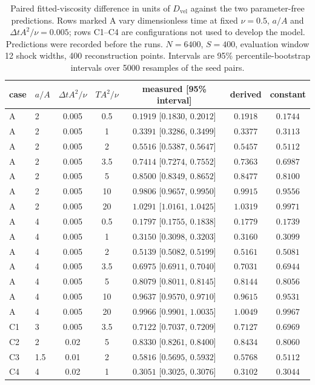 \begin{table}[!htbp]
\centering\small
\caption{Paired fitted-viscosity difference in units of $D_{\mathrm{vel}}$ against the two parameter-free predictions. Rows marked A vary dimensionless time at fixed $\nu=0.5$, $a/A$ and $\Delta t A^2/\nu=0.005$; rows C1--C4 are configurations not used to develop the model. Predictions were recorded before the runs. $N=6400$, $S=400$, evaluation window 12 shock widths, 400 reconstruction points. Intervals are 95\% percentile-bootstrap intervals over 5000 resamples of the seed pairs.}
\label{tab:response-validation}
\begin{tabular}{llccccc}
\toprule
case & $a/A$ & $\Delta t A^2/\nu$ & $TA^2/\nu$ & measured [95\% interval] & derived & constant\\
\midrule
A & 2 & 0.005 & 0.5 & $0.1919$ [$0.1830$, $0.2012$] & $0.1918$ & $0.1744$\\
A & 2 & 0.005 & 1 & $0.3391$ [$0.3286$, $0.3499$] & $0.3377$ & $0.3113$\\
A & 2 & 0.005 & 2 & $0.5516$ [$0.5387$, $0.5647$] & $0.5457$ & $0.5112$\\
A & 2 & 0.005 & 3.5 & $0.7414$ [$0.7274$, $0.7552$] & $0.7363$ & $0.6987$\\
A & 2 & 0.005 & 5 & $0.8500$ [$0.8349$, $0.8652$] & $0.8477$ & $0.8100$\\
A & 2 & 0.005 & 10 & $0.9806$ [$0.9657$, $0.9950$] & $0.9915$ & $0.9556$\\
A & 2 & 0.005 & 20 & $1.0291$ [$1.0161$, $1.0425$] & $1.0319$ & $0.9971$\\
A & 4 & 0.005 & 0.5 & $0.1797$ [$0.1755$, $0.1838$] & $0.1779$ & $0.1739$\\
A & 4 & 0.005 & 1 & $0.3150$ [$0.3098$, $0.3203$] & $0.3160$ & $0.3099$\\
A & 4 & 0.005 & 2 & $0.5139$ [$0.5082$, $0.5199$] & $0.5161$ & $0.5081$\\
A & 4 & 0.005 & 3.5 & $0.6975$ [$0.6911$, $0.7040$] & $0.7031$ & $0.6944$\\
A & 4 & 0.005 & 5 & $0.8079$ [$0.8011$, $0.8145$] & $0.8144$ & $0.8056$\\
A & 4 & 0.005 & 10 & $0.9637$ [$0.9570$, $0.9710$] & $0.9615$ & $0.9531$\\
A & 4 & 0.005 & 20 & $0.9966$ [$0.9901$, $1.0035$] & $1.0049$ & $0.9967$\\
\addlinespace
C1 & 3 & 0.005 & 3.5 & $0.7122$ [$0.7037$, $0.7209$] & $0.7127$ & $0.6969$\\
\addlinespace
C2 & 2 & 0.02 & 5 & $0.8330$ [$0.8261$, $0.8400$] & $0.8434$ & $0.8060$\\
\addlinespace
C3 & 1.5 & 0.01 & 2 & $0.5816$ [$0.5695$, $0.5932$] & $0.5768$ & $0.5112$\\
\addlinespace
C4 & 4 & 0.02 & 1 & $0.3051$ [$0.3025$, $0.3076$] & $0.3102$ & $0.3044$\\
\bottomrule
\end{tabular}
\end{table}
